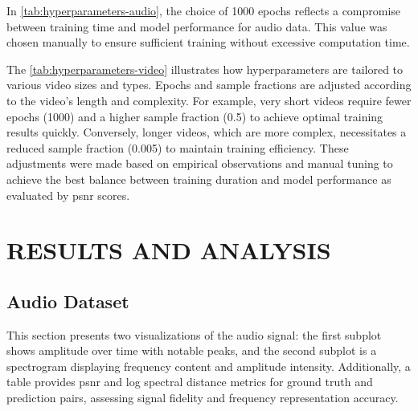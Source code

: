 \documentclass{ioereport}
\begin{document}
In \autoref{tab:hyperparameters-audio}, the choice of 1000 epochs reflects a compromise between training time and model performance for audio data. This value was chosen manually to ensure sufficient training without excessive computation time.

The \autoref{tab:hyperparameters-video} illustrates how hyperparameters are tailored to various video sizes and types. Epochs and sample fractions are adjusted according to the video's length and complexity. For example, very short videos require fewer epochs (1000) and a higher sample fraction (0.5) to achieve optimal training results quickly. Conversely, longer videos, which are more complex, necessitates a reduced sample fraction (0.005) to maintain training efficiency. These adjustments were made based on empirical observations and manual tuning to achieve the best balance between training duration and model performance as evaluated by \gls{psnr} scores.



\pagebreak 

\section{\MakeUppercase{Results and Analysis}}

    \subsection{Audio Dataset}
    This section presents two visualizations of the audio signal: the first subplot shows amplitude over time with notable peaks, and the second subplot is a spectrogram displaying frequency content and amplitude intensity. Additionally, a table provides \gls{psnr} and log spectral distance metrics for ground truth and prediction pairs, assessing signal fidelity and frequency representation accuracy.
    
\end{document}
